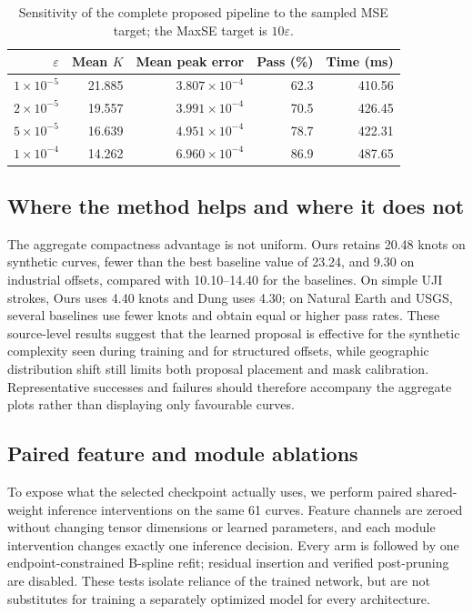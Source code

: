 \documentclass[preprint,12pt]{elsarticle}
\begin{document}
\begin{table}[t]
\centering
\caption{Sensitivity of the complete proposed pipeline to the sampled MSE
target; the MaxSE target is $10\varepsilon$.}
\label{tab:threshold-sweep}
\begin{tabular}{rrrrr}
\toprule
$\varepsilon$ & Mean $K$ & Mean peak error & Pass (\%) & Time (ms) \\
\midrule
$1\times10^{-5}$ & 21.885 & $3.807\times10^{-4}$ & 62.3 & 410.56 \\
$2\times10^{-5}$ & 19.557 & $3.991\times10^{-4}$ & 70.5 & 426.45 \\
$5\times10^{-5}$ & 16.639 & $4.951\times10^{-4}$ & 78.7 & 422.31 \\
$1\times10^{-4}$ & 14.262 & $6.960\times10^{-4}$ & 86.9 & 487.65 \\
\bottomrule
\end{tabular}
\end{table}

\subsection{Where the method helps and where it does not}
The aggregate compactness advantage is not uniform. Ours retains 20.48 knots
on synthetic curves, fewer than the best baseline value of 23.24, and 9.30 on
industrial offsets, compared with 10.10--14.40 for the baselines. On simple UJI
strokes, Ours uses 4.40 knots and Dung uses 4.30; on Natural Earth and USGS,
several baselines use fewer knots and obtain equal or higher pass rates. These
source-level results suggest that the learned proposal is effective for the
synthetic complexity seen during training and for structured offsets, while
geographic distribution shift still limits both proposal placement and mask
calibration. Representative successes and failures should therefore accompany
the aggregate plots rather than displaying only favourable curves.

\subsection{Paired feature and module ablations}
To expose what the selected checkpoint actually uses, we perform paired
shared-weight inference interventions on the same 61 curves. Feature channels
are zeroed without changing tensor dimensions or learned parameters, and each
module intervention changes exactly one inference decision. Every arm is
followed by one endpoint-constrained B-spline refit; residual insertion and
verified post-pruning are disabled. These tests isolate reliance of the
trained network, but are not substitutes for training a separately optimized
model for every architecture.
\end{document}
